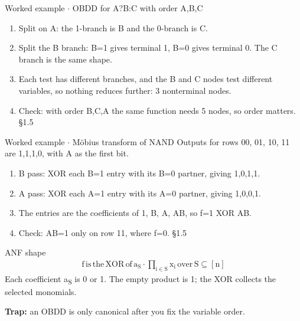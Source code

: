 \documentclass[11pt]{article}
\begin{document}
\begin{keepsection}
\begin{workedbox}{Worked example \ensuremath{\cdot} OBDD for A?B:C with order A,B,C}
\begin{enumerate}
\item Split on A: the 1-branch is B and the 0-branch is C.
\item Split the B branch: B=1 gives terminal 1, B=0 gives terminal 0. The C branch is the same shape.
\item Each test has different branches, and the B and C nodes test different variables, so nothing reduces further: 3 nonterminal nodes.
\item Check: with order B,C,A the same function needs 5 nodes, so order matters. \hfill{\small\color{FAUblue}§1.5}
\end{enumerate}
\end{workedbox}

\begin{workedbox}{Worked example \ensuremath{\cdot} Möbius transform of NAND}
Outputs for rows 00, 01, 10, 11 are 1,1,1,0, with A as the first bit.

\begin{enumerate}
\item B pass: XOR each B=1 entry with its B=0 partner, giving 1,0,1,1.
\item A pass: XOR each A=1 entry with its A=0 partner, giving 1,0,0,1.
\item The entries are the coefficients of 1, B, A, AB, so f=1 XOR AB.
\item Check: AB=1 only on row 11, where f=0. \hfill{\small\color{FAUblue}§1.5}
\end{enumerate}
\end{workedbox}

\begin{equationcard}{ANF shape}
\[ \begin{gathered} \mathrm{f}\, \text{is}\, \text{the}\, \text{XOR}\, \text{of}\, \mathrm{a}_{\mathrm{S}}\cdot ∏_{\mathrm{i}\in \mathrm{S}}\mathrm{x}_{\mathrm{i}}\, \text{over}\, \mathrm{S}⊆[\mathrm{n}] \end{gathered} \]
{\small Each coefficient a\textsubscript{S} is 0 or 1. The empty product is 1; the XOR collects the selected monomials.}
\end{equationcard}

\begin{notebox}\textbf{Trap:} an OBDD is only canonical after you fix the variable order.\end{notebox}


\end{keepsection}
\end{document}
